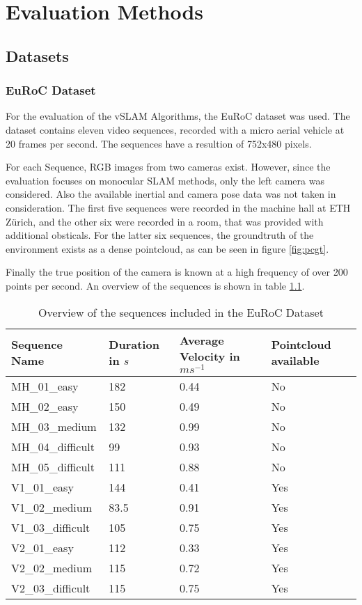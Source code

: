 \chapter{Evaluation Methods}

\section{Datasets}

	\subsection{EuRoC Dataset}

	For the evaluation of the vSLAM Algorithms, the EuRoC dataset \cite{euroc} was used.
	The dataset contains eleven video sequences, recorded with a micro aerial vehicle at 20 frames per second.
	The sequences have a resultion of 752x480 pixels.
	
	For each Sequence, RGB images from two cameras exist. However, since the evaluation
	focuses on monocular SLAM methods, only the left camera was considered. Also the available 
	inertial and camera pose data was not taken in consideration. The first five sequences were recorded in 
	the machine hall at ETH Zürich, and the other six were recorded in a room, that was provided 
	with additional obsticals. For the latter six sequences, the groundtruth of the environment 
	exists as a dense pointcloud, as can be seen in figure \ref{fig:pcgt}.


	Finally the true position of the 
	camera is known at a high frequency of over 200 points per second. 
	An overview of the sequences is shown in table \ref{table:euroctable}.



	\begin{table}
	\caption{Overview of the sequences included in the EuRoC Dataset}
	\begin{tabular}{ |p{3cm}||p{3cm}|p{3cm}|p{3cm}|}
	\hline
	Sequence Name& Duration in $s$ & Average Velocity in $ms^{-1}$ &Pointcloud available\\
	\hline
	MH\_01\_easy & 182 & 0.44 & No\\
	MH\_02\_easy & 150 & 0.49 & No\\
	MH\_03\_medium & 132 & 0.99 & No\\
	MH\_04\_difficult & 99 & 0.93 & No\\
	MH\_05\_difficult & 111 & 0.88 & No\\
	V1\_01\_easy & 144 & 0.41 & Yes\\
	V1\_02\_medium & 83.5 & 0.91 & Yes\\
	V1\_03\_difficult & 105 & 0.75 & Yes\\
	V2\_01\_easy & 112 & 0.33 & Yes\\
	V2\_02\_medium & 115 & 0.72 & Yes\\
	V2\_03\_difficult & 115 & 0.75 & Yes\\
	\hline
	\end{tabular}
	\label{table:euroctable}
	\end{table}

